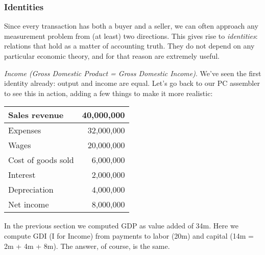 \documentclass[12pt,letterpaper]{article}
\begin{document}
\subsubsection*{Identities}


Since every transaction has both a buyer and a seller, we can
often approach any measurement problem from (at least) two directions.
This gives rise to {\it identities\/}:
relations that hold as a matter of accounting truth.
They do not depend on any particular economic theory,
and for that reason are extremely useful.


{\it Income (Gross Domestic Product = Gross Domestic Income)\/}.
We've seen the first identity already:
output and income are equal.
Let's go back to our PC assembler to see this in action, adding a
few things to make it more realistic:
\begin{center}
\begin{tabular}{lr} %
                    Sales revenue      &40,000,000         \\
\hline %
                    Expenses           &32,000,000         \\
         \hspace{0.25in} Wages         &20,000,000         \\
         \hspace{0.25in} Cost of goods sold \hspace{0.25in}         & 6,000,000         \\
         \hspace{0.25in} Interest      & 2,000,000         \\
         \hspace{0.25in} Depreciation  & 4,000,000         \\
                    Net income         & 8,000,000
\end{tabular}
\end{center}
In the previous section we computed GDP as value added of 34m.
Here we compute GDI (I for Income) from payments to labor (20m)
and capital (14m = 2m + 4m + 8m).
The answer, of course, is the same.
\end{document}
